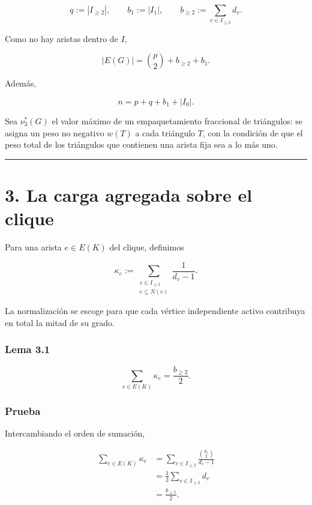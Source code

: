 \documentclass[
  11pt,
]{article}
\begin{document}
\[
q:=|I_{\ge2}|,
\qquad
b_1:=|I_1|,
\qquad
b_{\ge2}:=\sum_{v\in I_{\ge2}}d_v.
\]

Como no hay aristas dentro de \(I\),

\[
|E(G)|
=
\binom{p}{2}+b_{\ge2}+b_1.
\tag{2.1}
\]

Además,

\[
n=p+q+b_1+|I_0|.
\tag{2.2}
\]

Sea \(\nu_3^*(G)\) el valor máximo de un empaquetamiento fraccional de
triángulos: se asigna un peso no negativo \(w(T)\) a cada triángulo
\(T\), con la condición de que el peso total de los triángulos que
contienen una arista fija sea a lo más uno.

\begin{center}\rule{0.5\linewidth}{0.5pt}\end{center}

\section{3. La carga agregada sobre el
clique}\label{la-carga-agregada-sobre-el-clique}

Para una arista \(e\in E(K)\) del clique, definimos

\[
\kappa_e
:=
\sum_{\substack{v\in I_{\ge2}\\ e\subseteq N(v)}}
\frac{1}{d_v-1}.
\tag{3.1}
\]

La normalización se escoge para que cada vértice independiente activo
contribuya en total la mitad de su grado.

\subsubsection{Lema 3.1}\label{lema-3.1}

\[
\sum_{e\in E(K)}\kappa_e
=
\frac{b_{\ge2}}2.
\]

\subsubsection{Prueba}\label{prueba}

Intercambiando el orden de sumación,

\[
\begin{aligned}
\sum_{e\in E(K)}\kappa_e
&=
\sum_{v\in I_{\ge2}}
\frac{\binom{d_v}{2}}{d_v-1}\\
&=
\frac12
\sum_{v\in I_{\ge2}}d_v\\
&=
\frac{b_{\ge2}}2.
\end{aligned}
\]
\end{document}
